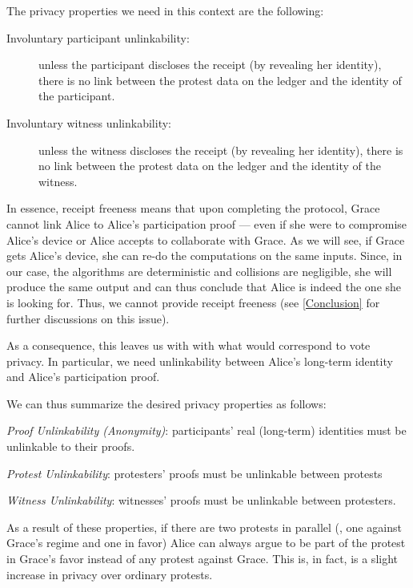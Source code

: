 The privacy properties we need in this context are the following:
\begin{description}
 \item[Involuntary participant unlinkability:]  unless the participant discloses the receipt 
   (by revealing her identity), there is no link between the protest data on 
   the ledger and the identity of the participant.

 \item[Involuntary witness unlinkability:]  unless the witness discloses the receipt (by revealing her 
   identity), there is no link between the protest data on the ledger and the 
   identity of the witness.
\end{description}
In essence, receipt freeness means that upon completing the protocol, Grace cannot link Alice to Alice's participation proof --- even if she were to compromise Alice's device or Alice accepts to collaborate with Grace.
As we will see, if Grace gets Alice's device, she can re-do the computations on the same inputs.
Since, in our case, the algorithms are deterministic and collisions are negligible, she will produce the same output and can thus conclude that Alice is indeed the one she is looking for.
Thus, we cannot provide receipt freeness (see \cref{Conclusion} for further discussions on this issue).

As a consequence, this leaves us with with what would correspond to vote privacy.
In particular, we need unlinkability between Alice's long-term identity and Alice's participation proof.


We can thus summarize the desired privacy properties as follows:
\begin{requirements}[P]
\item\label{ProofUnlink} \emph{Proof Unlinkability (Anonymity)}: participants' real (long-term) 
  identities must be unlinkable to their proofs.
\item\label{ProtestUnlink} \emph{Protest Unlinkability}: protesters' proofs must be 
  unlinkable between protests 
\item\label{WitnessUnlink}\emph{Witness Unlinkability}:  witnesses' proofs must be unlinkable between 
  protesters.
\end{requirements}

As a result of these properties, if there are two protests in parallel (\eg, one against Grace's regime and one in favor) Alice can always argue to be part of the protest in Grace's favor instead of any protest against Grace.
This is, in fact, is a slight increase in privacy over ordinary protests.

